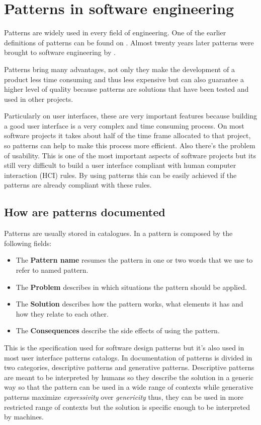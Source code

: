 \section{Patterns in software engineering}
\label{section:Patterns_in_software_engineering}
Patterns are widely used in every field of engineering. One of the earlier definitions of patterns can be found on \cite{A_Pattern_Language_Towns_Buildings_Construction}. Almost twenty years later patterns were brought to software engineering by \cite{Design_Patterns}.

Patterns bring many advantages, not only they make the development of a product less time consuming and thus less expensive but can also guarantee a higher level of quality because patterns are solutions that have been tested and used in other projects.

Particularly on user interfaces, these are very important features because building a good user interface is a very complex and time consuming process. On most software projects it takes about half of the time frame allocated to that project, so patterns can help to make this process more efficient. Also there's the problem of usability. This is one of the most important aspects of software projects but its still very difficult to build a user interface compliant with human computer interaction (HCI) rules. By using patterns this can be easily achieved if the patterns are already compliant with these rules.

\subsection{How are patterns documented}
Patterns are usually stored in catalogues. In \cite{Design_Patterns} a pattern is composed by the following fields:
\begin{itemize}
\item The \textbf{Pattern name} resumes the pattern in one or two words that we use to refer to named pattern.
\item The \textbf{Problem} describes in which situations the pattern should be applied.
\item The \textbf{Solution} describes how the pattern works, what elements it has and how they relate to each other.
\item The \textbf{Consequences} describe the side effects of using the pattern.
\end{itemize}
This is the specification used for software design patterns but it's also used in most user interface patterns catalogs.
In \cite{Generative_pattern-based_design_of_user_interfaces} documentation of patterns is divided in two categories, descriptive patterns and generative patterns. Descriptive patterns are meant to be interpreted by humans so they describe the solution in a generic way so that the pattern can be used in a wide range of contexts while generative patterns maximize \textit{expressivity} over \textit{genericity} thus, they can be used in more restricted range of contexts but the solution is specific enough to be interpreted by machines. 

